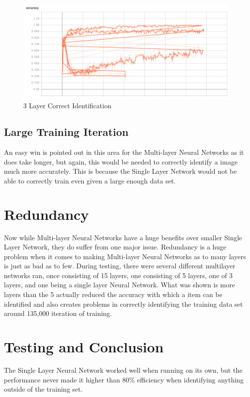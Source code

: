 \documentclass{article}
\begin{document}
\begin{figure}[h]
  \centering
  \includegraphics[width=\textwidth]{pics/3layercorrect.png}
  \caption{3 Layer Correct Identification}
\end{figure}

\subsection{Large Training Iteration}
An easy win is pointed out in this area for the Multi-layer Neural Networks as it does take longer, but again, this would be needed to correctly identify a image much more accurately. This is because the Single Layer Network would not be able to correctly train even given a large enough data set.

\section{Redundancy}
Now while Multi-layer Neural Networks have a huge benefits over smaller Single Layer Network, they do suffer from one major issue. Redundancy is a huge problem when it comes to making Multi-layer Neural Networks as to many layers is just as bad as to few. During testing, there were several different multilayer networks ran, once consisting of 15 layers, one consisting of 5 layers, one of 3 layers, and one being a single layer Neural Network. What was shown is more layers than the 5 actually reduced the accuracy with which a item can be identified and also creates problems in correctly identifying the training data set around 135,000 iteration of training.


\section{Testing and Conclusion}
The Single Layer Neural Network worked well when running on its own, but the performance never made it higher than 80\% efficiency when identifying anything outside of the training set.
\end{document}
